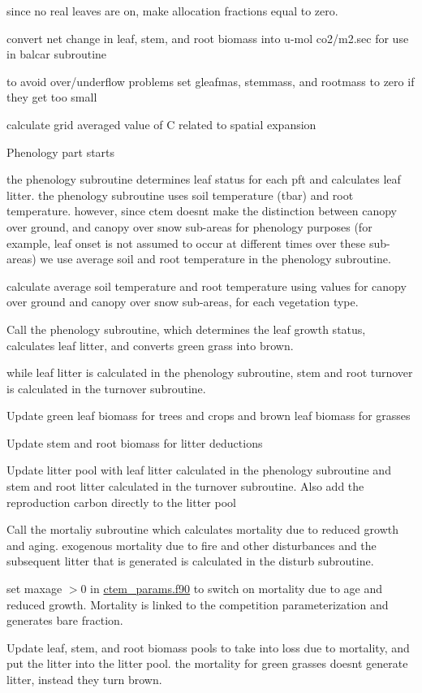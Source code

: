 since no real leaves are on, make allocation fractions equal to zero.

convert net change in leaf, stem, and root biomass into u-\/mol co2/m2.\+sec for use in balcar subroutine

to avoid over/underflow problems set gleafmas, stemmass, and rootmass to zero if they get too small

calculate grid averaged value of C related to spatial expansion

Phenology part starts

the phenology subroutine determines leaf status for each pft and calculates leaf litter. the phenology subroutine uses soil temperature (tbar) and root temperature. however, since ctem doesn\textquotesingle{}t make the distinction between canopy over ground, and canopy over snow sub-\/areas for phenology purposes (for example, leaf onset is not assumed to occur at different times over these sub-\/areas) we use average soil and root temperature in the phenology subroutine.

calculate average soil temperature and root temperature using values for canopy over ground and canopy over snow sub-\/areas, for each vegetation type.

Call the phenology subroutine, which determines the leaf growth status, calculates leaf litter, and converts green grass into brown.

while leaf litter is calculated in the phenology subroutine, stem and root turnover is calculated in the turnover subroutine.

Update green leaf biomass for trees and crops and brown leaf biomass for grasses

Update stem and root biomass for litter deductions

Update litter pool with leaf litter calculated in the phenology subroutine and stem and root litter calculated in the turnover subroutine. Also add the reproduction carbon directly to the litter pool

Call the mortaliy subroutine which calculates mortality due to reduced growth and aging. exogenous mortality due to fire and other disturbances and the subsequent litter that is generated is calculated in the disturb subroutine.

set maxage $>$0 in \hyperlink{ctem__params_8f90}{ctem\+\_\+params.\+f90} to switch on mortality due to age and reduced growth. Mortality is linked to the competition parameterization and generates bare fraction.

Update leaf, stem, and root biomass pools to take into loss due to mortality, and put the litter into the litter pool. the mortality for green grasses doesn\textquotesingle{}t generate litter, instead they turn brown.

